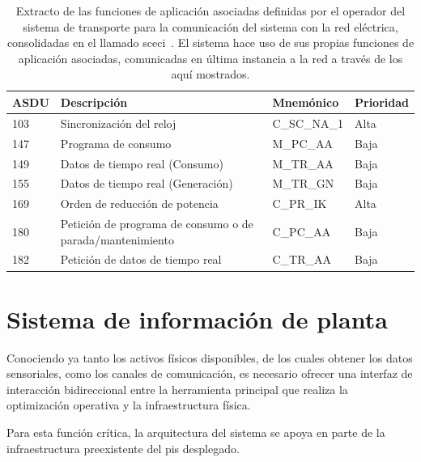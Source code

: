 \begin{table}[ht]
  \centering
  \begin{tabular}{|l|p{7.5cm}|l|l|}
    \hline
    ASDU & Descripción                                               & Mnemónico   & Prioridad \\
    \hline
    103  & Sincronización del reloj                                  & C\_SC\_NA\_1 & Alta     \\
    147  & Programa de consumo                                       & M\_PC\_AA    & Baja     \\
    149  & Datos de tiempo real (Consumo)                            & M\_TR\_AA    & Baja     \\
    155  & Datos de tiempo real (Generación)                         & M\_TR\_GN    & Baja     \\
    169  & Orden de reducción de potencia                            & C\_PR\_IK    & Alta     \\
    180  & Petición de programa de consumo o de parada/mantenimiento & C\_PC\_AA    & Baja     \\
    182  & Petición de datos de tiempo real                          & C\_TR\_AA    & Baja     \\
    \hline
  \end{tabular}
  \caption[Funciones de aplicación para la comunicación con la red eléctrica.]{Extracto de las funciones de aplicación asociadas definidas por el operador del sistema de transporte para la comunicación del sistema con la red eléctrica, consolidadas en el llamado \gls{sceci}~\cite{ree2009protocolo}. El sistema hace uso de sus propias funciones de aplicación asociadas, comunicadas en última instancia a la red a través de los aquí mostrados.}%
  \label{tab:funciones-de-aplicacion-red}
\end{table}

\section{Sistema de información de planta}%
\label{makereference3.4}

Conociendo ya tanto los activos físicos disponibles, de los cuales obtener los datos sensoriales, como los canales de comunicación, es necesario ofrecer una interfaz de interacción bidireccional entre la herramienta principal que realiza la optimización operativa y la infraestructura física.

Para esta función crítica, la arquitectura del sistema se apoya en parte de la infraestructura preexistente del \gls{pis} desplegado.

